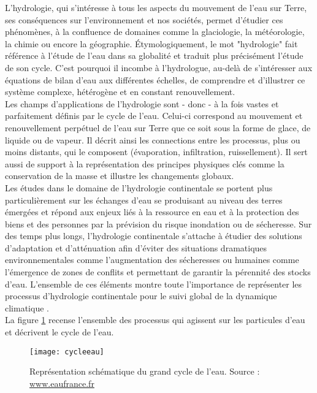 L'hydrologie, qui s'intéresse à tous les aspects du mouvement de l'eau sur Terre, ses conséquences sur l'environnement et nos sociétés, permet d'étudier ces phénomènes, à la confluence de domaines comme la glaciologie, la météorologie, la chimie ou encore la géographie. \'Etymologiquement, le mot "hydrologie" fait référence à l'étude de l'eau dans sa globalité et traduit plus précisément l'étude de son cycle. C'est pourquoi il incombe à l'hydrologue, au-delà de s'intéresser aux équations de bilan d'eau aux différentes échelles, de comprendre et d'illustrer ce système complexe, hétérogène et en constant renouvellement. \\
Les champs d'applications de l'hydrologie sont - donc - à la fois vastes et parfaitement définis par le cycle de l'eau. Celui-ci correspond au mouvement et renouvellement perpétuel de l'eau sur Terre que ce soit sous la forme de glace, de liquide ou de vapeur. Il décrit ainsi les connections entre les processus, plus ou moins distants, qui le composent (évaporation, infiltration, ruissellement). Il sert aussi de support à la représentation des principes physiques clés comme la conservation de la masse et illustre les changements globaux. \\
Les études dans le domaine de l'hydrologie continentale se portent plus particulièrement sur les échanges d'eau se produisant au niveau des terres émergées et répond aux enjeux liés à la ressource en eau et à la protection des biens et des personnes par la prévision du risque inondation ou de sécheresse. Sur des temps plus longs, l'hydrologie continentale s'attache à étudier des solutions d'adaptation et d'atténuation afin d'éviter des situations dramatiques environnementales comme l'augmentation des sécheresses ou humaines comme l'émergence de zones de conflits et permettant de garantir la pérennité des stocks d'eau. L'ensemble de ces éléments montre toute l'importance de représenter les processus d'hydrologie continentale pour le suivi global de la dynamique climatique \citep{alkama2008,douville2016}.\\

 
La figure \ref{cycleeau} recense l'ensemble des processus qui agissent sur les particules d'eau et décrivent le cycle de l'eau. 

\begin{figure}[h!]
 \centerline{\texttt{[image: cycleeau]}}
 \caption{Représentation schématique du grand cycle de l'eau. Source : \url{www.eaufrance.fr}}
 \label{cycleeau}
\end{figure} 

